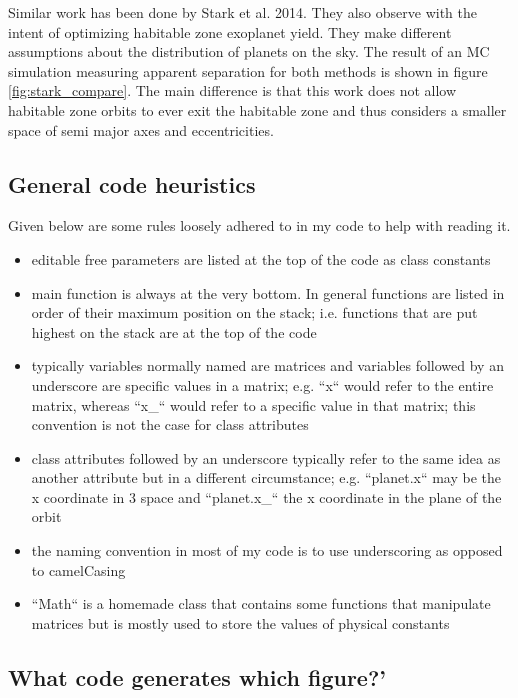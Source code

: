 \documentclass{article}
\begin{document}
	Similar work has been done by Stark et al. 2014. They also observe with the intent of optimizing habitable zone exoplanet yield. They make different assumptions about the distribution of planets on the sky. The result of an MC simulation measuring apparent separation for both methods is shown in figure \ref{fig:stark_compare}. The main difference is that this work does not allow habitable zone orbits to ever exit the habitable zone and thus considers a smaller space of semi major axes and eccentricities. 
	
	\subsection{General code heuristics}

	Given below are some rules loosely adhered to in my code to help with reading it.
	
	\begin{itemize}
		\item editable free parameters are listed at the top of the code as class constants
		\item main function is always at the very bottom. In general functions are listed in order of their maximum position on the stack; i.e. functions that are put highest on the stack are at the top of the code
		\item typically variables normally named are matrices and variables followed by an underscore are specific values in a matrix; e.g. ``x`` would refer to the entire matrix, whereas ``x\_`` would refer to a specific value in that matrix; this convention is not the case for class attributes
		\item class attributes followed by an underscore typically refer to the same idea as another attribute but in a different circumstance; e.g. ``planet.x`` may be the x coordinate in 3 space and ``planet.x\_`` the x coordinate in the plane of the orbit 
		\item the naming convention in most of my code is to use underscoring as opposed to camelCasing
		\item ``Math`` is a homemade class that contains some functions that manipulate matrices but is mostly used to store the values of physical constants
	\end{itemize}
	
	\subsection{What code generates which figure?'}
	
\end{document}

